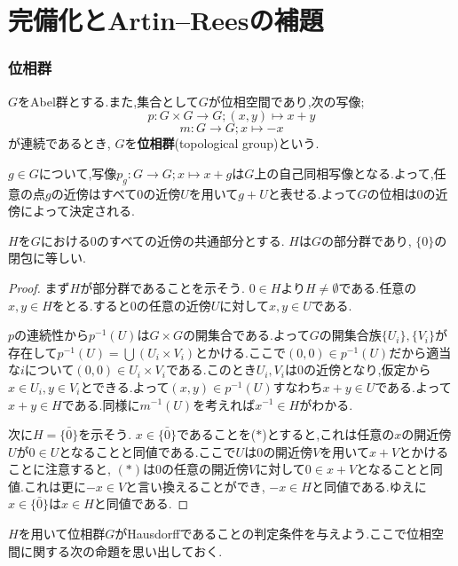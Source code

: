 \part[completion,and Artin--Rees lemma]{完備化とArtin--Reesの補題}
\section{位相群}

\begin{defi}[位相群]
	$G$をAbel群とする.また,集合として$G$が位相空間であり,次の写像;
	\[p:G\times G\to G;(x,y)\mapsto x+y\]
	\[m:G\to G;x\mapsto -x\]
	が連続であるとき, $G$を\textbf{位相群}(topological group)という.
\end{defi}

$g\in G$について,写像$p_g:G\to G;x\mapsto x+g$は$G$上の自己同相写像となる.よって,任意の点$g$の近傍はすべて$0$の近傍$U$を用いて$g+U$と表せる.よって$G$の位相は$0$の近傍によって決定される.

\begin{prop}
	$H$を$G$における$0$のすべての近傍の共通部分とする. $H$は$G$の部分群であり, $\{0\}$の閉包に等しい.
\end{prop}

\begin{proof}
	まず$H$が部分群であることを示そう. $0\in H$より$H\neq\emptyset$である.任意の$x,y\in H$をとる.すると$0$の任意の近傍$U$に対して$x,y\in U$である. 
	
	$p$の連続性から$p^{-1}(U)$は$G\times G$の開集合である.よって$G$の開集合族$\{U_i\},\{V_i\}$が存在して$p^{-1}(U)=\bigcup (U_i\times V_i)$とかける.ここで$(0,0)\in p^{-1}(U)$だから適当な$i$について$(0,0)\in U_i\times V_i$である.このとき$U_i,V_i$は$0$の近傍となり,仮定から$x\in U_i,y\in V_i$とできる.よって$(x,y)\in p^{-1}(U)$すなわち$x+y\in U$である.よって$x+y\in H$である.同様に$m^{-1}(U)$を考えれば$x^{-1}\in H$がわかる.
	
	次に$H=\bar{\{0\}}$を示そう. $x\in\bar{\{0\}}$であることを($\ast$)とすると,これは任意の$x$の開近傍$U$が$0\in U$となることと同値である.ここで$U$は$0$の開近傍$V$を用いて$x+V$とかけることに注意すると, $(\ast)$は$0$の任意の開近傍$V$に対して$0\in x+V$となることと同値.これは更に$-x\in V$と言い換えることができ, $-x\in H$と同値である.ゆえに$x\in\bar{\{0\}}$は$x\in H$と同値である.
\end{proof}

$H$を用いて位相群$G$がHausdorffであることの判定条件を与えよう.ここで位相空間に関する次の命題を思い出しておく.

